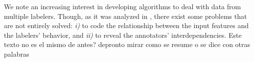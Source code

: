 \documentclass[journal]{IEEEtran}
\newcommand{\comment}[2]{{\color{blue}#1} {\color{red}#2}}
\begin{document}

\comment{We note an increasing interest in developing algorithms to deal with
data from multiple labelers. Though, as it was analyzed in
\cite{g2019machine}, there exist some problems that are not entirely
solved: \textit{i)} to code the relationship between the input
features and the labelers' behavior, and \textit{ii)} to reveal the
annotators' interdependencies.}{Este texto no es el mismo de antes? depronto mirar como se resume o se dice con otras palabras}
\end{document}
